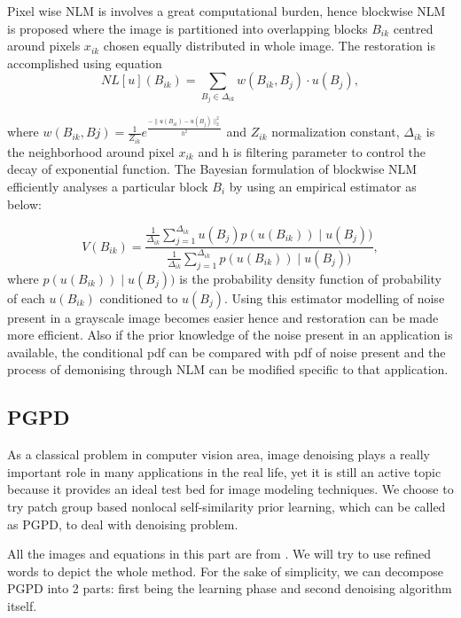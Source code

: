 Pixel wise NLM is involves a great computational burden, hence blockwise NLM is proposed where the image is partitioned into overlapping blocks $B_{ik}$  centred around pixels $x_{ik}$ chosen equally distributed in whole image. The restoration is accomplished using equation 
\begin{equation}
NL[u](B_{ik})=\sum_{B_{j} \in \Delta_{ik}}{w(B_{ik},B_j)\cdot u(B_{j})},
\end{equation}

where $w(B_{ik},Bj)=\frac{1}{Z_{ik}} e^\frac{-\parallel u(B_{ik})-u(B_j) \parallel _{2}^2 }{h^2}$ and $Z_{ik}$ normalization constant, $\Delta_{ik}$ is the neighborhood around pixel $x_{ik}$ and h is filtering parameter to control the decay of exponential function. 
The Bayesian formulation of blockwise NLM efficiently analyses a particular block $B_i$ by using an empirical estimator as below:

\begin{equation}
V(B_{ik}) = \frac{\frac{1}{\Delta_{ik}} \sum^{\Delta_{ik}}_{j=1} u(B_j) p(u(B_{ik})) \mid u(B_{j}))}  {\frac{1}{\Delta_{ik}} \sum^{\Delta_{ik}}_{j=1} p(u(B_{ik})) \mid u(B_{j}))},
\end{equation}
where \(p(u(B_{ik})) \mid u(B_{j}))\) is the probability density function of probability of each $u(B_{ik})$ conditioned to $u(B_{j})$. Using this estimator modelling of noise present in a grayscale image becomes easier hence and restoration can be made more efficient. Also if the prior knowledge of the noise present in an application is available, the conditional pdf can be compared with pdf of noise present and the process of demonising through NLM can be modified specific to that application.

\subsection{PGPD}
As a classical problem in computer vision area, image denoising plays a really important role in many applications in the real life, yet it is still an active topic because it provides an ideal test bed for image modeling techniques. We choose to try patch group based nonlocal self-similarity prior learning, which can be called as PGPD, to deal with denoising problem. 

All the images and equations in this part are from \cite{xu2015patch}. We will try to use refined words to depict the whole method. For the sake of simplicity, we can decompose PGPD into 2 parts: first being the learning phase and second denoising algorithm itself. 

